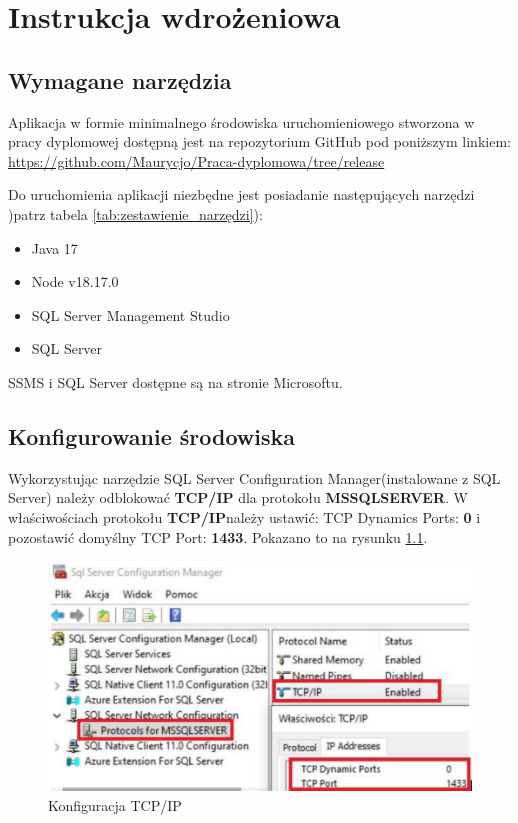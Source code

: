 \chapter{Instrukcja wdrożeniowa}

\section{Wymagane narzędzia}
Aplikacja w formie minimalnego środowiska uruchomieniowego stworzona w pracy dyplomowej dostępną jest na repozytorium GitHub pod poniższym linkiem: \newline
 \url{https://github.com/Maurycjo/Praca-dyplomowa/tree/release}


Do uruchomienia aplikacji niezbędne jest posiadanie następujących narzędzi )patrz tabela \ref{tab:zestawienie_narzędzi}): 
\begin{itemize}
	\item Java 17
	\item Node v18.17.0
	\item SQL Server Management Studio
	\item SQL Server 
\end{itemize}

SSMS i SQL Server dostępne są na stronie Microsoftu.


\section{Konfigurowanie środowiska}
Wykorzystując narzędzie SQL Server Configuration Manager(instalowane z SQL Server) należy odblokować \textbf{TCP/IP} dla protokołu \textbf{MSSQLSERVER}. W właściwościach protokołu \textbf{TCP/IP}należy ustawić: TCP Dynamics Ports: \textbf{0} i pozostawić domyślny TCP Port: \textbf{1433}. Pokazano to na rysunku \ref{tcpip:label}.
\begin{figure}[htb]
		\centering
    \includegraphics[width=0.6\linewidth]{rysA/tcpip.pdf}
    \caption{Konfiguracja TCP/IP}
    \label{tcpip:label}
\end{figure}



